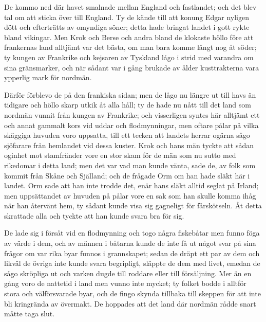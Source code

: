 \initial De kommo ned där havet smalnade mellan England och fastlandet; och det blev tal om att sticka över till England. Ty de kände till att konung Edgar nyligen dött och efterträtts av omyndiga söner; detta hade bringat landet i gott rykte bland vikingar. Men Krok och Berse och andra bland de klokaste höllo före att frankernas land alltjämt var det bästa, om man bara komme långt nog åt söder; ty kungen av Frankrike och kejsaren av Tyskland lågo i strid med varandra om sina gränsmarker, och när sådant var i gång brukade av ålder kusttrakterna vara ypperlig mark för nordmän.

\initial Därför förblevo de på den frankiska sidan; men de lågo nu längre ut till havs än tidigare och höllo skarp utkik åt alla håll; ty de hade nu nått till det land som nordmän vunnit från kungen av Frankrike; och visserligen syntes här alltjämt ett och annat gammalt kors vid uddar och flodmynningar, men oftare pålar på vilka skäggiga huvuden voro uppsatta, till ett tecken att landets herrar ogärna sågo sjöfarare från hemlandet vid dessa kuster. Krok och hans män tyckte att sådan oginhet mot stamfränder vore en stor skam för de män som nu sutto med rikedomar i detta land; men det var vad man kunde vänta, sade de, av folk som kommit från Skåne och Själland; och de frågade Orm om han hade släkt här i landet. Orm sade att han inte trodde det, enär hans släkt alltid seglat på Irland; men uppsättandet av huvuden på pålar vore en sak som han skulle komma ihåg när han återvänt hem, ty sådant kunde visa sig gagneligt för fårskötseln. Åt detta skrattade alla och tyckte att han kunde svara bra för sig.

\initial De lade sig i försåt vid en flodmynning och togo några fiskebåtar men funno föga av värde i dem, och av männen i båtarna kunde de inte få ut något svar på sina frågor om var rika byar funnos i grannskapet; sedan de dräpt ett par av dem och likväl de övriga inte kunde svara begripligt, släppte de dem med livet, emedan de sågo skröpliga ut och varken dugde till roddare eller till försäljning. Mer än en gång voro de nattetid i land men vunno inte mycket; ty folket bodde i alltför stora och välförsvarade byar, och de fingo skynda tillbaka till skeppen för att inte bli kringrända av övermakt. De hoppades att det land där nordmän rådde snart måtte taga slut.

